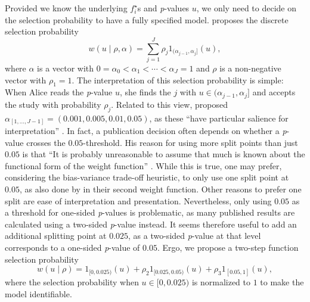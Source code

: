\documentclass{article}
\theoremstyle{plain}
\theoremstyle{definition}
\begin{document}
Provided we know the underlying $f_{i}^{\star}$s and \textit{p}-values $u$, we only need to decide on the selection probability to have a fully specified model. \citet{hedges1992modeling} proposes the discrete selection probability
\begin{equation}
w(u\mid\rho,\alpha)=\sum_{j=1}^{J}\rho_{j}1_{(\alpha_{j-1},\alpha_{j}]}(u),\label{eq:Weighted model step function}
\end{equation}
where $\alpha$ is a vector with $0=\alpha_{0}<\alpha_{1}<\cdots<\alpha_{J}=1$ and $\rho$ is a non-negative vector with $\rho_{1}=1$. The interpretation of this selection probability is simple: When Alice reads the \textit{p}-value $u$, she finds the $j$ with $u\in(\alpha_{j-1},\alpha_{j}]$ and accepts the study with probability $\rho_{j}$. Related to this view, \citet{hedges1992modeling} proposed $\alpha_{[1,\dots,J-1]} = (0.001,0.005,0.01,0.05)$, as these \enquote{have particular salience for interpretation} \citep{hedges1992modeling}. In fact, a publication decision often depends on whether a \textit{p}-value crosses the $0.05$-threshold. His reason for using more split points than just $0.05$ is that \enquote{It is probably unreasonable to assume that much is known about the functional form of the weight function} \citep{hedges1992modeling}. While this is true, one may prefer, considering the bias-variance trade-off heuristic, to only use one split point at $0.05$, as also done by \citet{iyengar1988selection} in their second weight function. Other reasons to prefer one split are ease of interpretation and presentation. Nevertheless, only using $0.05$ as a threshold for one-sided \textit{p}-values is problematic, as many published results are calculated using a two-sided \textit{p}-value instead. It seems therefore useful to add an additional splitting point at $0.025$, as a two-sided \textit{p}-value at that level corresponds to a one-sided \textit{p}-value of $0.05$. Ergo, we propose a two-step function selection probability
\[
w(u\mid\rho)=1_{[0,0.025)}(u)+\rho_{2}1_{[0.025,0.05)}(u)+\rho_{3}1_{\left[0.05,1\right]}(u),
\]
where the selection probability when $u\in[0,0.025)$ is normalized to $1$ to make the model identifiable.
\end{document}
